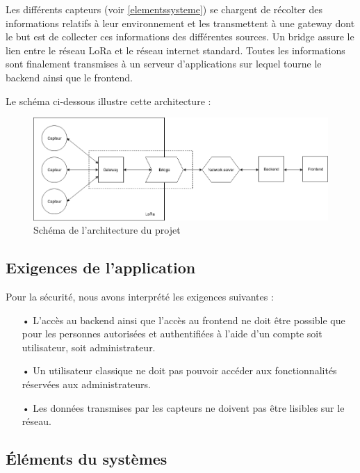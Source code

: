 \documentclass[12pt]{article}
\begin{document}
Les différents capteurs (voir \autoref{elementssysteme}) se chargent de récolter des informations relatifs à leur environnement et les transmettent à une gateway dont le but est de collecter ces informations des différentes sources. Un bridge assure le lien entre le réseau LoRa et le réseau internet standard. Toutes les informations sont finalement transmises à un serveur d'applications sur lequel tourne le backend ainsi que le frontend.

Le schéma ci-dessous illustre cette architecture :

\begin{figure}[h!]
\includegraphics[width=\textwidth]{architecture}
\caption{Schéma de l'architecture du projet}
\end{figure}

\subsection{Exigences de l'application} %

Pour la sécurité, nous avons interprété les exigences suivantes :

\begin{itemize}
\item[•] L'accès au backend ainsi que l'accès au frontend ne doit être possible que pour les personnes autorisées et authentifiées à l'aide d'un compte soit utilisateur, soit administrateur.
\item[•] Un utilisateur classique ne doit pas pouvoir accéder aux fonctionnalités réservées aux administrateurs.
\item[•] Les données transmises par les capteurs ne doivent pas être lisibles sur le réseau.
\end{itemize}

\subsection{Éléments du systèmes}\label{elementssysteme} %
\end{document}
